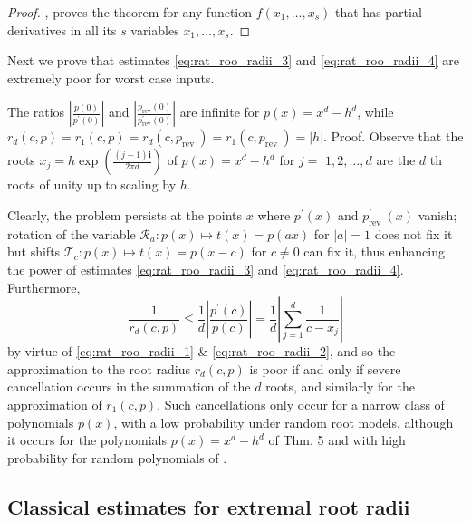 \documentclass[sigconf]{acmart}
\begin{document}
\begin{proof}
\cite{Linnainmaa1976}, \cite{baur1983complexity} proves the theorem for any function $f\left(x_{1}, \ldots, x_{s}\right)$ that has partial derivatives in all its $s$ variables $x_{1}, \ldots, x_{s}$.
\end{proof}

Next we prove that estimates \ref{eq:rat_roo_radii_3} and \ref{eq:rat_roo_radii_4} are extremely poor for worst case inputs.

\begin{theorem}
The ratios $\left|\frac{p(0)}{p^{\prime}(0)}\right|$ and $\left|\frac{p_{\mathrm{rev}}(0)}{p_{\mathrm{rev}}^{\prime}(0)}\right|$ are infinite for $p(x)=x^{d}-h^{d}$, while $r_{d}(c, p)=r_{1}(c, p)=r_{d}\left(c, p_{\text {rev }}\right)=r_{1}\left(c, p_{\text {rev }}\right)=|h|$.
Proof. Observe that the roots $x_{j}=h \exp \left(\frac{(j-1) \mathbf{i}}{2 \pi d}\right)$ of $p(x)=x^{d}-h^{d}$ for $j=$ $1,2, \ldots, d$ are the $d$ th roots of unity up to scaling by $h$.
\end{theorem}

Clearly, the problem persists at the points $x$ where $p^{\prime}(x)$ and $p_{\text {rev }}^{\prime}(x)$ vanish; rotation of the variable $\mathcal{R}_a :p(x) \mapsto t(x)=p(a x)$ for $|a|=1$ does not fix it but shifts $\mathcal{T}_c : p(x) \mapsto t(x)=p(x-c)$ for $c \neq 0$ can fix it, thus enhancing the power of estimates \ref{eq:rat_roo_radii_3} and \ref{eq:rat_roo_radii_4}.
Furthermore,
$$
\frac{1}{r_{d}(c, p)} \leq \frac{1}{d}\left|\frac{p^{\prime}(c)}{p(c)}\right|=\frac{1}{d}\left|\sum_{j=1}^{d} \frac{1}{c-x_{j}}\right|
$$
by virtue of \ref{eq:rat_roo_radii_1} \& \ref{eq:rat_roo_radii_2}, and so the approximation to the root radius $r_{d}(c, p)$ is poor if and only if severe cancellation occurs in the summation of the $d$ roots, and similarly for the approximation of $r_{1}(c, p)$. Such cancellations only occur for a narrow class of polynomials $p(x)$, with a low probability under random root models, although it occurs for the polynomials $p(x)=x^{d}-h^{d}$ of Thm. 5 and with high probability for random polynomials of \cite{erdos1950distribution}.

\subsection{Classical estimates for extremal root radii}\label{subsec:class_est}
\end{document}
